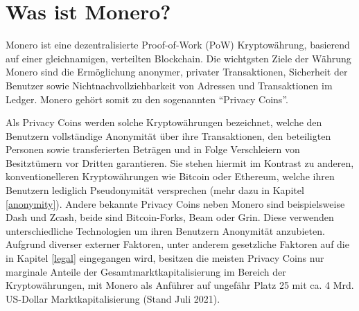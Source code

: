 \chapter{Was ist Monero?}
Monero ist eine dezentralisierte Proof-of-Work (PoW) Kryptowährung, basierend auf einer gleichnamigen, verteilten Blockchain\cite[vgl. Abstract]{Koe2020}.
Die wichtgsten Ziele der Währung Monero sind die Ermöglichung anonymer, privater Transaktionen, Sicherheit der Benutzer sowie Nichtnachvollziehbarkeit von Adressen und Transaktionen im Ledger.
Monero gehört somit zu den sogenannten ``Privacy Coins''.

Als Privacy Coins werden solche Kryptowährungen bezeichnet, welche den Benutzern vollständige Anonymität über ihre Transaktionen, den beteiligten Personen sowie transferierten Beträgen
und in Folge Verschleiern von Besitztümern vor Dritten garantieren.
Sie stehen hiermit im Kontrast zu anderen, konventionelleren Kryptowährungen wie Bitcoin oder Ethereum, welche ihren Benutzern lediglich Pseudonymität versprechen\cite{Vermaak2021} (mehr dazu in Kapitel \ref{anonymity}).
Andere bekannte Privacy Coins neben Monero sind beispielsweise Dash und Zcash, beide sind Bitcoin-Forks, Beam oder Grin. Diese verwenden unterschiedliche Technologien um ihren Benutzern Anonymität anzubieten.\\
Aufgrund diverser externer Faktoren, unter anderem gesetzliche Faktoren auf die in Kapitel \ref{legal} eingegangen wird, besitzen die meisten Privacy Coins nur marginale Anteile der Gesamtmarktkapitalisierung im Bereich der Kryptowährungen, 
mit Monero als Anführer auf ungefähr Platz 25 mit ca. 4 Mrd. US-Dollar Marktkapitalisierung (Stand Juli 2021)\cite{CoinMarketCap2021}.


